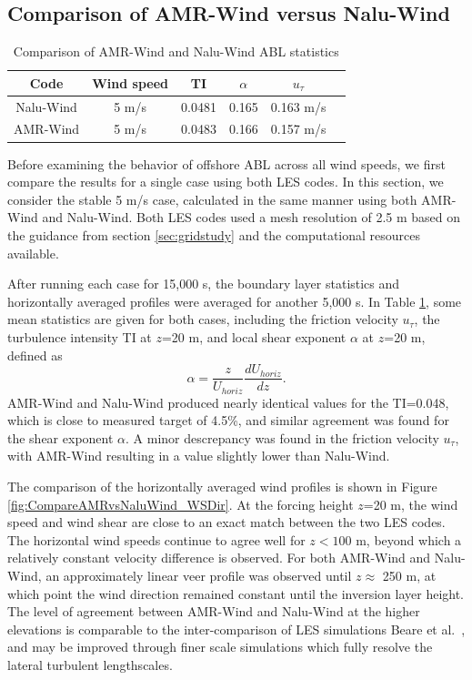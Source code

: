 \subsection{Comparison of AMR-Wind versus Nalu-Wind}

\begin{table}
\caption{\label{tab:CompareAMRvsNalu} Comparison of AMR-Wind and
  Nalu-Wind ABL statistics} \centering
\begin{tabular}{cccccc}
  \hline
  Code & Wind speed & TI      &  $\alpha$  &   $u_\tau$ \\ %
  \hline
  Nalu-Wind & 5 m/s &  0.0481 &  0.165     &  0.163 m/s \\ %
  AMR-Wind  & 5 m/s &  0.0483 &  0.166     &  0.157 m/s \\ %
  \hline
\end{tabular}
\end{table}

Before examining the behavior of offshore ABL across all wind speeds,
we first compare the results for a single case using both LES codes.
In this section, we consider the stable 5 m/s case, calculated in the
same manner using both AMR-Wind and Nalu-Wind.  Both LES codes used a
mesh resolution of 2.5 m based on the guidance from section
\ref{sec:gridstudy} and the computational resources available.

After running each case for 15,000 s, the boundary layer
statistics and horizontally averaged profiles were averaged for
another 5,000 s.  In Table \ref{tab:CompareAMRvsNalu}, some mean
statistics are given for both cases, including the friction velocity
$u_\tau$, the turbulence intensity TI at $z$=20 m, and local shear
exponent $\alpha$ at $z$=20 m, defined as
$$ \alpha = \frac{z}{U_{horiz}} \frac{d U_{horiz}}{dz}.
$$ AMR-Wind and Nalu-Wind produced nearly identical values for the
TI=0.048, which is close to measured target of 4.5\%, and similar
agreement was found for the shear exponent $\alpha$.  A minor
descrepancy was found in the friction velocity $u_\tau$, with AMR-Wind
resulting in a value slightly lower than Nalu-Wind.

The comparison of the horizontally averaged wind profiles is shown in
Figure  \ref{fig:CompareAMRvsNaluWind_WSDir}.  At the forcing height
$z$=20 m, the wind speed and wind shear are close to an exact match
between the two LES codes.  The horizontal wind speeds continue to
agree well for $z < 100$ m, beyond which a relatively constant velocity
difference is observed.   For both AMR-Wind and Nalu-Wind, an
approximately linear veer profile was observed until $z\approx$ 250 m,
at which point the wind direction remained constant until the
inversion layer height.
The level of agreement between AMR-Wind and Nalu-Wind at the higher
elevations is comparable to the inter-comparison of LES simulations
Beare et al.~\cite{Beare2006}, and may be improved through finer scale
simulations which fully resolve the lateral turbulent lengthscales. 

